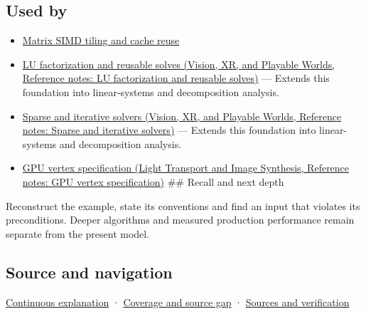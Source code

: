 \subsection{Used by}\label{appendix-ffdc1d4e5350-used-by}

\hypertarget{appendix-ffdc1d4e5350-used-by}{}

\begin{itemize}
\item
  \hyperref[appendix-1bfb7c657105]{Matrix SIMD tiling and cache reuse}
\item
  \href{../07-Vision-XR-and-Playable-Worlds/main.pdf\#nameddest=appendix-55e4b5b0a1e6}{LU factorization and reusable solves (Vision, XR, and Playable Worlds, Reference notes: LU factorization and reusable solves)} --- Extends this foundation into linear-systems and decomposition analysis.
\item
  \href{../07-Vision-XR-and-Playable-Worlds/main.pdf\#nameddest=appendix-67c87a3d9e94}{Sparse and iterative solvers (Vision, XR, and Playable Worlds, Reference notes: Sparse and iterative solvers)} --- Extends this foundation into linear-systems and decomposition analysis.
\item
  \href{../04-Light-Transport-and-Image-Synthesis/main.pdf\#nameddest=appendix-749ba51a6c25}{GPU vertex specification (Light Transport and Image Synthesis, Reference notes: GPU vertex specification)} \#\# Recall and next depth
\end{itemize}

Reconstruct the example, state its conventions and find an input that violates its preconditions. Deeper algorithms and measured production performance remain separate from the present model.

\subsection{Source and navigation}\label{appendix-ffdc1d4e5350-source-and-navigation}

\hypertarget{appendix-ffdc1d4e5350-source-and-navigation}{}

\hyperref[01-foundations-i-ch018-keep-the-promises-visible-while-moving-between-representations]{Continuous explanation} · \hyperref[appendix-fd090d982a15-phase-7---parts-601-700]{Coverage and source gap} · \hyperref[appendix-a103e7846d21-phase-7---source-analysis-and-verification]{Sources and verification}

